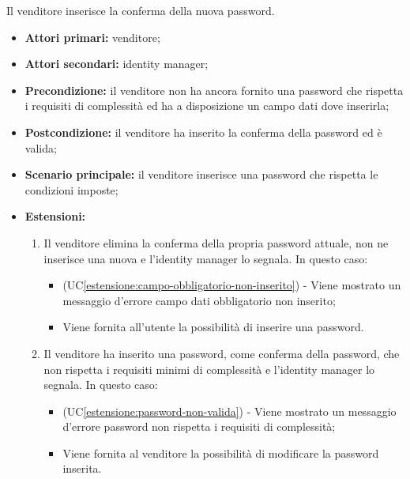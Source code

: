 Il venditore inserisce la conferma della nuova password.
\begin{itemize}
	\item \textbf{Attori primari:} venditore;
	\item \textbf{Attori secondari:} identity manager;
	\item \textbf{Precondizione:} il venditore non ha ancora fornito una password che rispetta i requisiti di complessità ed ha a disposizione un campo dati dove inserirla;
	\item \textbf{Postcondizione:} il venditore ha inserito la conferma della password ed è valida;
	\item \textbf{Scenario principale:} il venditore inserisce una password che rispetta le condizioni imposte;
	\item \textbf{Estensioni:}
	\begin{enumerate}[label=\lett]
		\item Il venditore elimina la conferma della propria password attuale, non ne inserisce una nuova e l'identity manager lo segnala. In questo caso:
		\begin{itemize}
			\item (UC\ref{estensione:campo-obbligatorio-non-inserito}) - Viene mostrato un messaggio d'errore campo dati obbligatorio non inserito;
			\item Viene fornita all'utente la possibilità di inserire una password.
		\end{itemize}
		\item Il venditore ha inserito una password, come conferma della password, che non rispetta i requisiti minimi di complessità e l'identity manager lo segnala. In questo caso:
		\begin{itemize}
			\item (UC\ref{estensione:password-non-valida}) - Viene mostrato un messaggio d'errore password non rispetta i requisiti di complessità;
			\item Viene fornita al venditore la possibilità di modificare la password inserita.
		\end{itemize}
	\end{enumerate} 
\end{itemize}

\label{modifica-informazioni-venditore.logo}

